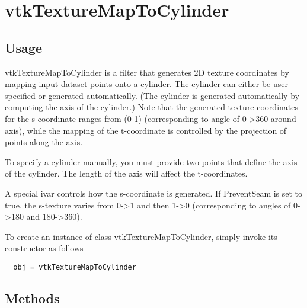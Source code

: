 \section{vtkTextureMapToCylinder}

\subsection{Usage}

 vtkTextureMapToCylinder is a filter that generates 2D texture coordinates
 by mapping input dataset points onto a cylinder. The cylinder can either be
 user specified or generated automatically. (The cylinder is generated 
 automatically by computing the axis of the cylinder.)  Note that the
 generated texture coordinates for the s-coordinate ranges from (0-1) 
 (corresponding to angle of 0->360 around axis), while the mapping of 
 the t-coordinate is controlled by the projection of points along the axis.

 To specify a cylinder manually, you must provide two points that
 define the axis of the cylinder. The length of the axis will affect the
 t-coordinates.
 
 A special ivar controls how the s-coordinate is generated. If PreventSeam
 is set to true, the s-texture varies from 0->1 and then 1->0 (corresponding
 to angles of 0->180 and 180->360).

To create an instance of class vtkTextureMapToCylinder, simply
invoke its constructor as follows
\begin{verbatim}
  obj = vtkTextureMapToCylinder
\end{verbatim}
\subsection{Methods}

